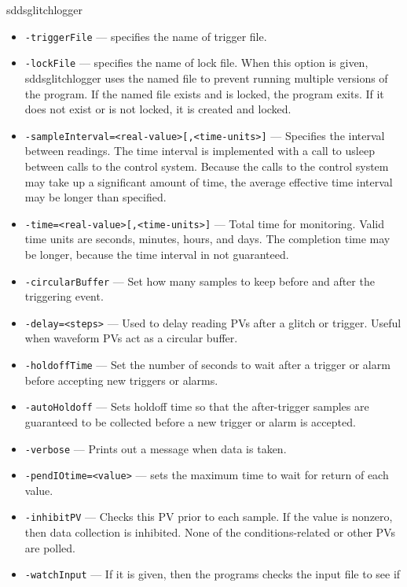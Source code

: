 \begin{sddsprog}{sddsglitchlogger}
\begin{itemize}
        \item {\tt -triggerFile} --- specifies the name of trigger file.
        \item {\tt -lockFile} --- specifies the name of lock file. When this option is given,
                sddsglitchlogger uses the named file to prevent running multiple versions of
                the program.  If the named file exists and is locked, the program exits.  
                If it does not exist or is not locked, it is created and locked.
        \item {\tt -sampleInterval=<real-value>[,<time-units>]} --- Specifies the interval between readings.
                The time interval is implemented with a call to usleep between calls to the control system.
                Because the calls to the control system may take up a significant amount of time, the average
                effective time interval may be longer than specified.
        \item {\tt -time=<real-value>[,<time-units>]} --- Total time for monitoring. Valid time units are
                seconds, minutes, hours, and days. The completion time may be longer, because the time
                interval in not guaranteed.
        \item {\tt -circularBuffer} --- Set how many samples to keep before and after the triggering event.
        \item {\tt -delay=<steps>} --- Used to delay reading PVs after a glitch or trigger. Useful when
                waveform PVs act as a circular buffer.
        \item {\tt -holdoffTime} --- Set the number of seconds to wait after a trigger or alarm before
                accepting new triggers or alarms.
        \item {\tt -autoHoldoff} --- Sets holdoff time so that the after-trigger samples are guaranteed
                to be collected before a new trigger or alarm is accepted.
        \item {\tt -verbose} --- Prints out a message when data is taken.
        \item {\tt -pendIOtime=<value>} --- sets the maximum time to wait for return of each value.
        \item {\tt -inhibitPV} --- Checks this PV prior to each sample.  If the value is nonzero,
                then data collection is inhibited.  None of the conditions-related or other PVs are polled.
        \item {\tt -watchInput} --- If it is given, then the programs checks the input file to see if

\end{itemize}
\end{sddsprog}
